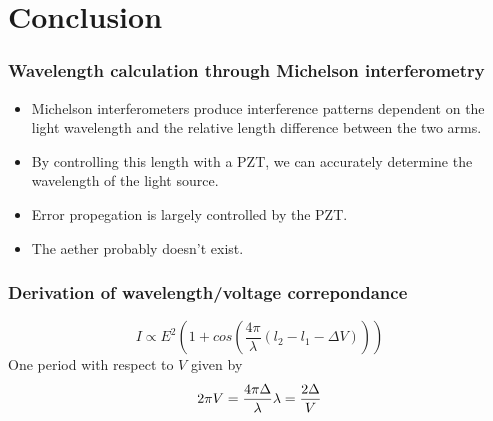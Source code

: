 \documentclass{beamer}
\begin{document}
\section{Conclusion}

\begin{frame}
  \frametitle{Wavelength calculation through Michelson interferometry}
  \begin{itemize}
    \item Michelson interferometers produce interference patterns dependent on the light wavelength and the relative length difference between the two arms.
      \pause
    \item By controlling this length with a PZT, we can accurately determine the wavelength of the light source.
      \pause
    \item Error propegation is largely controlled by the PZT.
      \pause
    \item The aether probably doesn't exist.
  \end{itemize}
\end{frame}

\begin{frame}
  \frametitle{Derivation of wavelength/voltage correpondance}
  \begin{center}
  \begin{equation*}
    I \propto E^2\left(1 + cos\left(\frac{4\pi}{\lambda} (l_2 - l_1 - \Delta V ) \right) \right)
  \end{equation*}
  One period with respect to $V$ given by
  \begin{equation*}
    2 \pi V = \frac{4 \pi \Delta}{\lambda}
    \\
    \lambda = \frac{2 \Delta}{V}
  \end{equation*}
\end{center}
\end{frame}
\end{document}
